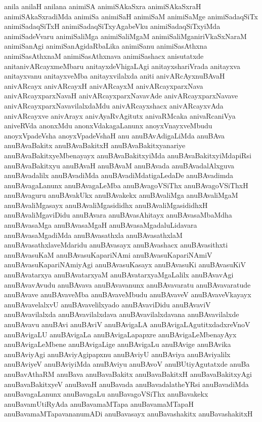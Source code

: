 {anila
anilaH
anilana
animiSA
animiSAkaSxra
animiSAkaSxraH
animiSAkaSxradiMda
animiSa
animiSaH
animiSaM
animiSaMge
animiSadaqSiTx
animiSadaqSiTxH
animiSadaqSiTxyAgabeVku
animiSadaqSiTxyiMda
animiSadeVvaru
animiSaliMga
animiSaliMgaM
animiSaliMganiriVkaSxNaraM
animiSanAgi
animiSanAgidaRbaLika
animiSanu
animiSasAthxna
animiSasAthxnaM
animiSasAthxnava
animiSashacx
anisutatxde
anitanivARcayxmeMbaru
anitayxdeVhigaLAgi
anitayxshariVrada
anitayxva
anitayxvanu
anitayxveMba
anitayxvilalxda
aniti
anivARcAyxnuBAvaH
anivARcayx
anivARcayxH
anivARcayxM
anivARcayxparxNava
anivARcayxparxNavaH
anivARcayxparxNavavAde
anivARcayxparxNavave
anivARcayxparxNavavilalxdaMdu
anivARcayxshacx
anivARcayxvAda
anivARcayxve
anivArayx
anivAyaRvAgitutx
anivaRMcaka
anivaRcaniVya
aniveRVda
anonxMdu
anonxVdakagaLanunx
anoyxVnayxveMbudu
anoyxVpadeVsha
anoyxVpadeVshaH
anu
anuBAvAdigaLiMda
anuBAva
anuBAvaBakitx
anuBAvaBakitxH
anuBAvaBakitxyanariye
anuBAvaBakitxyeMbenayayx
anuBAvaBakitxyiMda
anuBAvaBakitxyiMdapiRsi
anuBAvaBakitxyu
anuBAvaH
anuBAvaM
anuBAvada
anuBAvadalAlxguva
anuBAvadalilx
anuBAvadiMda
anuBAvadiMdatigaLedaDe
anuBAvadimda
anuBAvagaLanunx
anuBAvagaLeMba
anuBAvagoVSiThx
anuBAvagoVSiThxH
anuBAvaguru
anuBAvakUkx
anuBAvakekx
anuBAvaliMga
anuBAvaliMgaM
anuBAvaliMgasayx
anuBAvaliMgasididhx
anuBAvaliMgasididhxH
anuBAvaliMgaviDidu
anuBAvara
anuBAvasAhitayx
anuBAvasaMbaMdha
anuBAvasaMga
anuBAvasaMgaH
anuBAvasaMgadaluLidavara
anuBAvasaMgadiMda
anuBAvasathxla
anuBAvasathxlaM
anuBAvasathxlaveMdaridu
anuBAvasayx
anuBAvashacx
anuBAvasithxti
anuBAvasuKaM
anuBAvasuKapariNAmi
anuBAvasuKapariNAmiV
anuBAvasuKapariNAmiyAgi
anuBAvasuKasayx
anuBAvasuKi
anuBAvasuKiV
anuBAvatarxya
anuBAvatarxyaM
anuBAvatarxyaMgaLalilx
anuBAvavAgi
anuBAvavAvudu
anuBAvava
anuBAvavanunx
anuBAvavaratu
anuBAvavaratude
anuBAvave
anuBAvaveMba
anuBAvaveMbudu
anuBAvaveV
anuBAvaveVkayayx
anuBAvavelalxvU
anuBAvavelilxyado
anuBAvaviDidu
anuBAvaviV
anuBAvavilalxda
anuBAvavilalxdava
anuBAvavilalxdavana
anuBAvavilalxde
anuBAvavu
anuBAvi
anuBAviV
anuBAvigaLA
anuBAvigaLAgutitxdadxreVnoV
anuBAvigaLU
anuBAvigaLa
anuBAvigaLapapxre
anuBAvigaLeMbenayAyx
anuBAvigaLeMbene
anuBAvigaLige
anuBAvigaLu
anuBAvige
anuBAvika
anuBAviyAgi
anuBAviyAgipapxnu
anuBAviyU
anuBAviya
anuBAviyalilx
anuBAviyeV
anuBAviyiMda
anuBAviyu
anuBAvoV
anuBUtiyAgutatxde
anuBa
anuBavAthaRM
anuBava
anuBavaBakitx
anuBavaBakitxH
anuBavaBakitxyAgi
anuBavaBakitxyeV
anuBavaH
anuBavada
anuBavadalatheYRsi
anuBavadiMda
anuBavagaLanunx
anuBavagaLu
anuBavagoVSiThx
anuBavakekx
anuBavamUtiRyAda
anuBavamaMTapa
anuBavamaMTapaH
anuBavamaMTapavananumADi
anuBavasayx
anuBavashakitx
anuBavashakitxH
}

